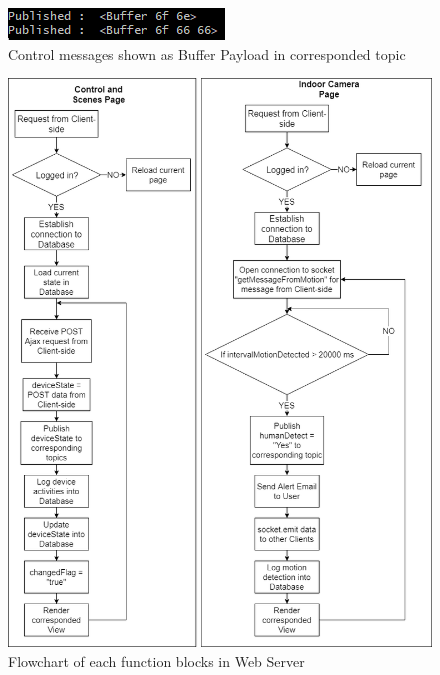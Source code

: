         \begin{figure}[!htb]
            \begin{center}
            \includegraphics[scale=1.5]{images/mqttPayload.png}
            \caption{Control messages shown as Buffer Payload in corresponded topic}
            \label{fig:mqttPayload}
            \end{center}
        \end{figure}
        \begin{figure}[!htb]
            \begin{center}
            \includegraphics[scale=0.53]{images/responseBlock.png}
            \caption{Flowchart of each function blocks in Web Server}
            \label{fig:responseBlock}
            \end{center}
        \end{figure}

